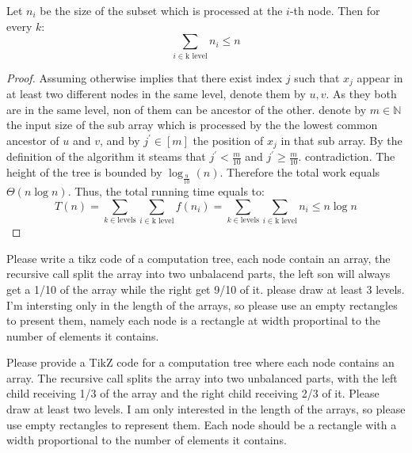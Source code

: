 \begin{example}
\begin{claim}
Let \(n_i\) be the size of the subset which is processed at the \(i\)-th node. Then for every \(k\):
\begin{equation*}
    \sum_{i \in \text{k level}}{n_i} \le n
\end{equation*}
\end{claim}
\begin{proof} Assuming otherwise implies that there exist index \(j\) such that \(x_j\) appear in at least two different nodes in the same level, denote them by \(u,v\). As they both are in the same level, non of them can be ancestor of the other. denote by \(m \in \mathbb{N}\) the input size of the sub array which is processed by the the lowest common ancestor of \(u\) and \(v\), and by \(j^\prime \in [m]\) the position of \(x_j\) in that sub array. By the definition of the algorithm it steams that \(j^\prime < \frac{m}{10} \) and \(j^\prime \ge \frac{m}{10}\). contradiction.  The height of the tree is bounded by \( \log_{\frac{9}{10}} \left(n\right) \). Therefore the total work equals \( \Theta \left( n\log n \right) \). Thus, the total running time equals to:
\begin{equation*}
    T(n) = \sum_{k \in \text{levels}}{\sum_{i \in \text{k level}}{f\left(n_i\right)}} = \sum_{k \in \text{levels}}{\sum_{i \in \text{k level}}{n_i}} \le n\log n  
\end{equation*}
\end{proof}
\end{example}



Please write a tikz code of a computation tree, each node contain an array, the recursive call split the array into two unbalacend parts, the left son will always get a 1/10 of the array while the right get 9/10 of it. please draw at least 3 levels. I'm intersting only in the length of the arrays, so please use an empty rectangles to present them, namely each node is a rectangle at width proportinal to the number of elements it contains.   

Please provide a TikZ code for a computation tree where each node contains an array. The recursive call splits the array into two unbalanced parts, with the left child receiving 1/3 of the array and the right child receiving 2/3 of it. Please draw at least two levels. I am only interested in the length of the arrays, so please use empty rectangles to represent them. Each node should be a rectangle with a width proportional to the number of elements it contains.  
 
